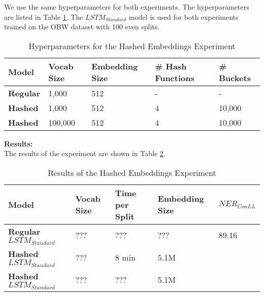 \documentclass[11pt]{article}
\begin{document}
We use the same hyperparameters for both experiments. The hyperparameters are listed in
Table \ref{tab:hashed-embeddings-hyperparameters}. The $LSTM_{Standard}$ model is used for both experiments 
trained on the OBW dataset with 100 even splits.\\

\begin{table}[h]
\centering
\begin{tabular}{|l|l|l|l|l|}
\hline
\textbf{Model} & \textbf{Vocab Size} & \textbf{Embedding Size} & \textbf{\# Hash Functions} & \textbf{\# Buckets} \\ \hline
\textbf{Regular} & 1,000 & 512 & - & -      \\ \hline
\textbf{Hashed}  & 1,000  & 512 & 4 & 10,000 \\ \hline
\textbf{Hashed}  & 100,000 & 512 & 4 & 10,000 \\ \hline
\end{tabular}
\caption{Hyperparameters for the Hashed Embeddings Experiment}
\label{tab:hashed-embeddings-hyperparameters}
\end{table}


\textbf{Results:}\\
The results of the experiment are shown in Table \ref{tab:hashed-embeddings-results}. 

\begin{table}[h]
\centering
\begin{tabular}{|l|l|l|l|l|}
\hline
\textbf{Model} & \textbf{Vocab Size} & \textbf{Time per Split} & \textbf{Embedding Size} & \textbf{$NER_{ConLL}$} \\ \hline
\textbf{Regular $LSTM_{Standard}$} & ??? & ???   & ???    & 89.16 \\ \hline
\textbf{Hashed $LSTM_{Standard}$}  & ??? & 8 min & 5.1M   & \\ \hline
\textbf{Hashed $LSTM_{Standard}$}  & ??? & ???   & 5.1M   & \\ \hline
\end{tabular}
\caption{Results of the Hashed Embeddings Experiment}
\label{tab:hashed-embeddings-results}
\end{table}




\end{document}
